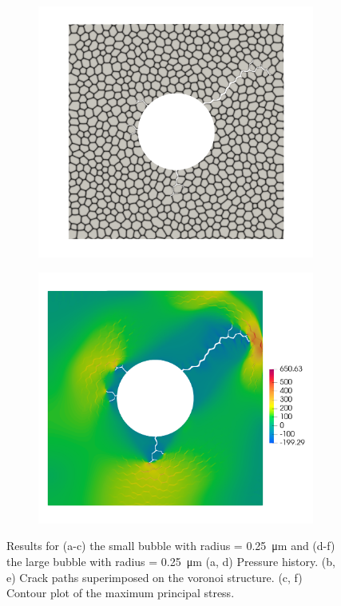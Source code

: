 \begin{figure}[htb!]
\begin{subfigure}[t]{0.32\linewidth}
    \caption{}
  \end{subfigure}
  \begin{subfigure}[t]{0.32\linewidth}
    \centering
    \includegraphics[width=\linewidth]{Chapter3/figures/r5_ext0}
    \caption{}
  \end{subfigure}
  \begin{subfigure}[t]{0.32\linewidth}
    \centering
    \includegraphics[width=\linewidth]{Chapter3/figures/r5_ext0_stress}
    \caption{}
  \end{subfigure}
  \caption{Results for (a-c) the small bubble with radius = \SI{0.25}{\micro\meter} and (d-f) the large bubble with radius = \SI{0.25}{\micro\meter} (a, d) Pressure history. (b, e) Crack paths superimposed on the voronoi structure. (c, f) Contour plot of the maximum principal stress.}
  \label{fig:r25}
\end{figure}

